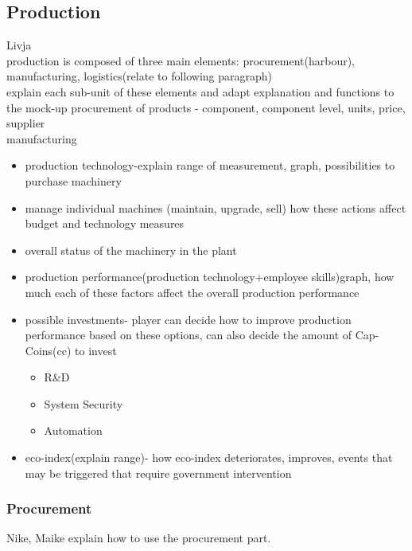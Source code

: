 \documentclass[11pt,titlepage,oneside,openany]{book}
\begin{document}
\subsection{Production}
Livja \\
 production is composed of three main elements: procurement(harbour), manufacturing, logistics(relate to following paragraph)\\
explain each sub-unit of these elements and adapt explanation and functions to the mock-up
procurement of products - component, component level, units, price, supplier \\
manufacturing
\begin{itemize} 
\item production technology-explain range of measurement, graph, possibilities to purchase machinery
\item manage individual machines (maintain, upgrade, sell) how these actions affect budget and technology measures
\item overall status of the machinery in the plant
\item production performance(production technology+employee skills)graph, how much each of these factors affect the overall production performance
 \item possible investments- player can decide how to improve production performance based on these options, can also decide the amount of Cap-Coins(cc) to invest
 \begin{itemize} 
 \item R\&D
 \item System Security
 \item Automation
 \end{itemize}
 \item eco-index(explain range)- how eco-index deteriorates, improves, events that may be triggered that require government intervention
\end{itemize}

\subsubsection{Procurement}
Nike, Maike explain how to use the procurement part.
\end{document}
